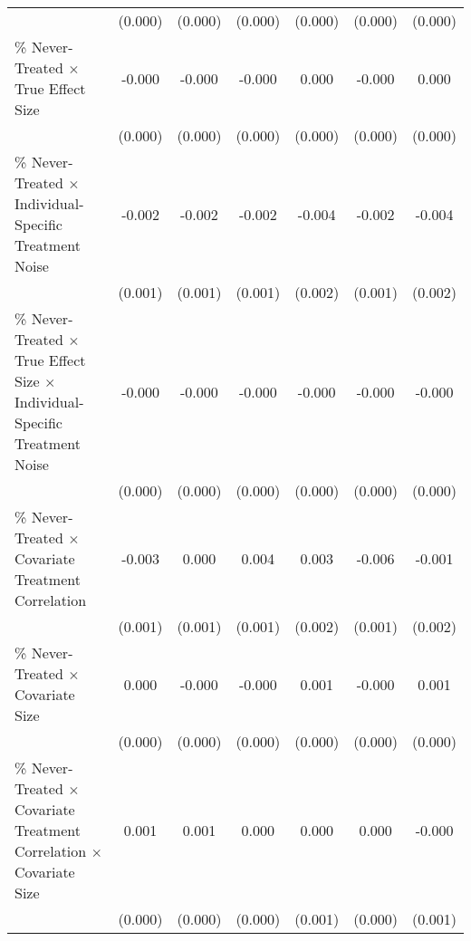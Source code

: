\begin{table}[htbp]
\begin{tabular}{l*{6}{c}}
                    &     (0.000)         &     (0.000)         &     (0.000)         &     (0.000)         &     (0.000)         &     (0.000)         \\
\% Never-Treated $\times$ True Effect Size&      -0.000         &      -0.000         &      -0.000         &       0.000         &      -0.000         &       0.000         \\
                    &     (0.000)         &     (0.000)         &     (0.000)         &     (0.000)         &     (0.000)         &     (0.000)         \\
\% Never-Treated $\times$ Individual-Specific Treatment Noise&      -0.002\sym{***}&      -0.002\sym{***}&      -0.002\sym{*}  &      -0.004\sym{**} &      -0.002\sym{**} &      -0.004\sym{**} \\
                    &     (0.001)         &     (0.001)         &     (0.001)         &     (0.002)         &     (0.001)         &     (0.002)         \\
\% Never-Treated $\times$ True Effect Size $\times$ Individual-Specific Treatment Noise&      -0.000\sym{*}  &      -0.000\sym{*}  &      -0.000         &      -0.000         &      -0.000         &      -0.000         \\
                    &     (0.000)         &     (0.000)         &     (0.000)         &     (0.000)         &     (0.000)         &     (0.000)         \\
\% Never-Treated $\times$ Covariate Treatment Correlation&      -0.003\sym{**} &       0.000         &       0.004\sym{***}&       0.003         &      -0.006\sym{***}&      -0.001         \\
                    &     (0.001)         &     (0.001)         &     (0.001)         &     (0.002)         &     (0.001)         &     (0.002)         \\
\% Never-Treated $\times$ Covariate Size&       0.000         &      -0.000         &      -0.000         &       0.001\sym{***}&      -0.000         &       0.001\sym{**} \\
                    &     (0.000)         &     (0.000)         &     (0.000)         &     (0.000)         &     (0.000)         &     (0.000)         \\
\% Never-Treated $\times$ Covariate Treatment Correlation $\times$ Covariate Size&       0.001         &       0.001         &       0.000         &       0.000         &       0.000         &      -0.000         \\
                    &     (0.000)         &     (0.000)         &     (0.000)         &     (0.001)         &     (0.000)         &     (0.001)         \\

\end{tabular}
\end{table}

